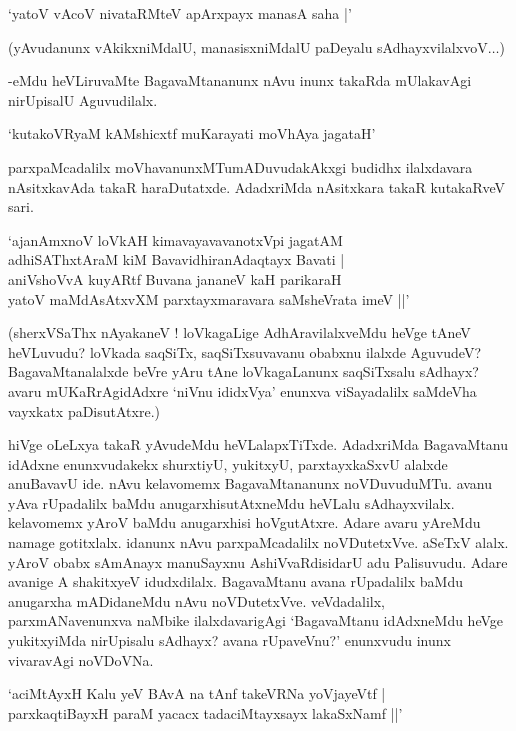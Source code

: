\begin{shloka}
`yatoV vAcoV nivataRMteV apArxpayx manasA saha |'
\end{shloka}

(yAvudanunx vAkikxniMdalU, manasisxniMdalU paDeyalu sAdhayxvilalxvoV$\ldots$)

-eMdu heVLiruvaMte BagavaMtananunx nAvu inunx takaRda mUlakavAgi nirUpisalU Aguvudilalx.

\begin{shloka}
`kutakoVR\s yaM kAMshicxtf muKarayati moVhAya jagataH'
\end{shloka}

parxpaMcadalilx moVhavanunxMTumADuvudakAkxgi budidhx ilalxdavara nAsitxkavAda takaR haraDutatxde. AdadxriMda nAsitxkara takaR kutakaRveV sari.

\begin{shloka}
`ajanAmxnoV loVkAH kimavayavavanotxV\s pi jagatAM\\
adhiSAThxtAraM kiM BavavidhiranAdaqtayx Bavati |\\
aniVshoVvA kuyARtf Buvana jananeV kaH parikaraH\\
yatoV maMdAsAtxvXM parxtayxmaravara saMsheVrata imeV ||'
\end{shloka}

(sherxVSaThx nAyakaneV ! loVkagaLige AdhAravilalxveMdu heVge tAneV heVLuvudu? loVkada saqSiTx, saqSiTxsuvavanu obabxnu ilalxde AguvudeV? BagavaMtanalalxde beVre yAru tAne loVkagaLanunx saqSiTxsalu sAdhayx? avaru mUKaRrAgidAdxre `niVnu ididxVya' enunxva viSayadalilx saMdeVha vayxkatx paDisutAtxre.)

hiVge oLeLxya takaR yAvudeMdu heVLalapxTiTxde. AdadxriMda BagavaMtanu idAdxne enunxvudakekx shurxtiyU, yukitxyU, parxtayxkaSxvU alalxde anuBavavU ide. nAvu kelavomemx BagavaMtananunx noVDuvuduMTu. avanu yAva rUpadalilx baMdu anugarxhisutAtxneMdu heVLalu sAdhayxvilalx. kelavomemx yAroV baMdu anugarxhisi hoVgutAtxre. Adare avaru yAreMdu namage gotitxlalx. idanunx nAvu parxpaMcadalilx noVDutetxVve. aSeTxV alalx. yAroV obabx sAmAnayx manuSayxnu AshiVvaRdisidarU adu Palisuvudu. Adare avanige A shakitxyeV idudxdilalx. BagavaMtanu avana rUpadalilx baMdu anugarxha mADidaneMdu nAvu noVDutetxVve. veVdadalilx, parxmANavenunxva naMbike ilalxdavarigAgi `BagavaMtanu idAdxneMdu heVge yukitxyiMda nirUpisalu sAdhayx? avana rUpaveVnu?' enunxvudu inunx vivaravAgi noVDoVNa.

\begin{shloka}
`aciMtAyxH Kalu yeV BAvA na tAnf takeVRNa yoVjayeVtf |\\
parxkaqtiBayxH paraM yacacx tadaciMtayxsayx lakaSxNamf ||'
\end{shloka}


